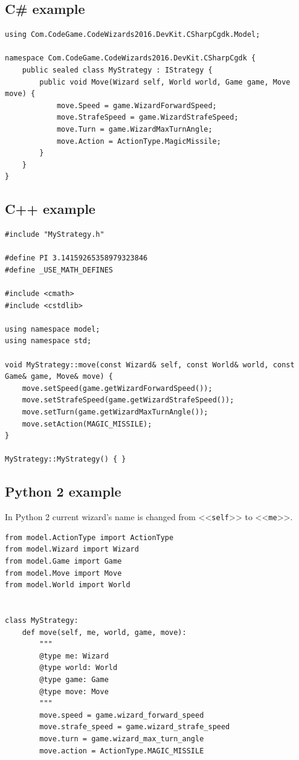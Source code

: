 \subsection{C\# example}

\begin{verbatim}
using Com.CodeGame.CodeWizards2016.DevKit.CSharpCgdk.Model;

namespace Com.CodeGame.CodeWizards2016.DevKit.CSharpCgdk {
    public sealed class MyStrategy : IStrategy {
        public void Move(Wizard self, World world, Game game, Move move) {
            move.Speed = game.WizardForwardSpeed;
            move.StrafeSpeed = game.WizardStrafeSpeed;
            move.Turn = game.WizardMaxTurnAngle;
            move.Action = ActionType.MagicMissile;
        }
    }
}
\end{verbatim}

\newpage
\subsection{C++ example}

\begin{verbatim}
#include "MyStrategy.h"

#define PI 3.14159265358979323846
#define _USE_MATH_DEFINES

#include <cmath>
#include <cstdlib>

using namespace model;
using namespace std;

void MyStrategy::move(const Wizard& self, const World& world, const Game& game, Move& move) {
    move.setSpeed(game.getWizardForwardSpeed());
    move.setStrafeSpeed(game.getWizardStrafeSpeed());
    move.setTurn(game.getWizardMaxTurnAngle());
    move.setAction(MAGIC_MISSILE);
}

MyStrategy::MyStrategy() { }
\end{verbatim}

\newpage
\subsection{Python 2 example}

In Python 2 current wizard's name is changed from <<\texttt{self}>> to <<\texttt{me}>>.

\begin{verbatim}
from model.ActionType import ActionType
from model.Wizard import Wizard
from model.Game import Game
from model.Move import Move
from model.World import World


class MyStrategy:
    def move(self, me, world, game, move):
        """
        @type me: Wizard
        @type world: World
        @type game: Game
        @type move: Move
        """
        move.speed = game.wizard_forward_speed
        move.strafe_speed = game.wizard_strafe_speed
        move.turn = game.wizard_max_turn_angle
        move.action = ActionType.MAGIC_MISSILE
\end{verbatim}

